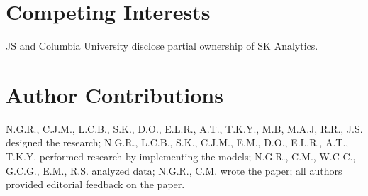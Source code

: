 \documentclass{article}\usepackage[]{graphicx}\usepackage[]{color}
\begin{document}
\section*{Competing Interests}
JS and Columbia University disclose partial ownership of SK Analytics.

\section*{Author Contributions}
N.G.R., C.J.M., L.C.B., S.K., D.O., E.L.R., A.T., T.K.Y., M.B, M.A.J, R.R., J.S. designed the research; N.G.R., L.C.B., S.K., C.J.M., E.M., D.O., E.L.R., A.T., T.K.Y. performed research by implementing the models; N.G.R., C.M., W.C-C., G.C.G., E.M., R.S. analyzed data; N.G.R., C.M. wrote the paper; all authors provided editorial feedback on the paper.



\end{document}
